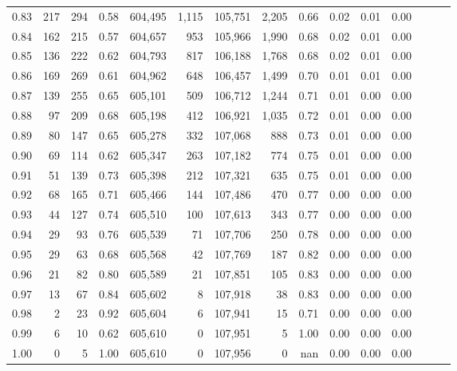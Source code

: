 \begin{tabular}{rrrrrrrrrrrrrrr}
0.83 &     217 &    294 &  0.58 &  604,495 &    1,115 &  105,751 &    2,205 &  0.66 &  0.02 &  0.01 &      0.00 \\
0.84 &     162 &    215 &  0.57 &  604,657 &      953 &  105,966 &    1,990 &  0.68 &  0.02 &  0.01 &      0.00 \\
0.85 &     136 &    222 &  0.62 &  604,793 &      817 &  106,188 &    1,768 &  0.68 &  0.02 &  0.01 &      0.00 \\
0.86 &     169 &    269 &  0.61 &  604,962 &      648 &  106,457 &    1,499 &  0.70 &  0.01 &  0.01 &      0.00 \\
0.87 &     139 &    255 &  0.65 &  605,101 &      509 &  106,712 &    1,244 &  0.71 &  0.01 &  0.00 &      0.00 \\
0.88 &      97 &    209 &  0.68 &  605,198 &      412 &  106,921 &    1,035 &  0.72 &  0.01 &  0.00 &      0.00 \\
0.89 &      80 &    147 &  0.65 &  605,278 &      332 &  107,068 &      888 &  0.73 &  0.01 &  0.00 &      0.00 \\
0.90 &      69 &    114 &  0.62 &  605,347 &      263 &  107,182 &      774 &  0.75 &  0.01 &  0.00 &      0.00 \\
0.91 &      51 &    139 &  0.73 &  605,398 &      212 &  107,321 &      635 &  0.75 &  0.01 &  0.00 &      0.00 \\
0.92 &      68 &    165 &  0.71 &  605,466 &      144 &  107,486 &      470 &  0.77 &  0.00 &  0.00 &      0.00 \\
0.93 &      44 &    127 &  0.74 &  605,510 &      100 &  107,613 &      343 &  0.77 &  0.00 &  0.00 &      0.00 \\
0.94 &      29 &     93 &  0.76 &  605,539 &       71 &  107,706 &      250 &  0.78 &  0.00 &  0.00 &      0.00 \\
0.95 &      29 &     63 &  0.68 &  605,568 &       42 &  107,769 &      187 &  0.82 &  0.00 &  0.00 &      0.00 \\
0.96 &      21 &     82 &  0.80 &  605,589 &       21 &  107,851 &      105 &  0.83 &  0.00 &  0.00 &      0.00 \\
0.97 &      13 &     67 &  0.84 &  605,602 &        8 &  107,918 &       38 &  0.83 &  0.00 &  0.00 &      0.00 \\
0.98 &       2 &     23 &  0.92 &  605,604 &        6 &  107,941 &       15 &  0.71 &  0.00 &  0.00 &      0.00 \\
0.99 &       6 &     10 &  0.62 &  605,610 &        0 &  107,951 &        5 &  1.00 &  0.00 &  0.00 &      0.00 \\
1.00 &       0 &      5 &  1.00 &  605,610 &        0 &  107,956 &        0 &   nan &  0.00 &  0.00 &      0.00 \\
\bottomrule
\end{tabular}
